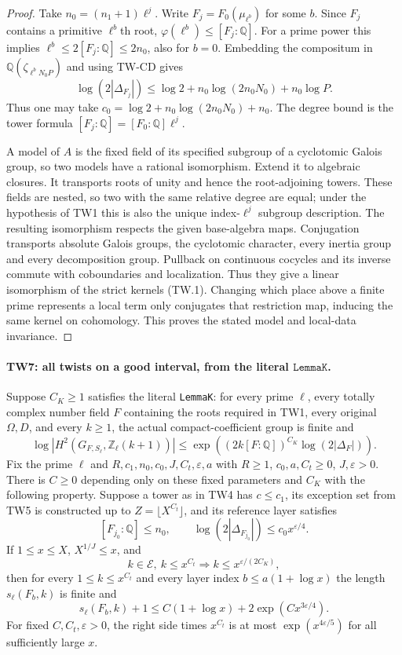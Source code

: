 \begin{proof}
Take $n_0=(n_1+1)\ell^j$.
Write $F_j=F_0(\mu_{\ell^b})$ for some $b$.
Since $F_j$ contains a primitive $\ell^b$th root,
$\varphi(\ell^b)\le[F_j:\mathbb Q]$.
For a prime power this implies
$\ell^b\le2[F_j:\mathbb Q]\le2n_0$, also for $b=0$.
Embedding the compositum in
$\mathbb Q(\zeta_{\ell^bN_0P})$ and using TW-CD gives
\[
 \log(2|\Delta_{F_j}|)
 \le \log2+n_0\log(2n_0N_0)+n_0\log P.
 \tag{TW.27}
\]
Thus one may take
$c_0=\log2+n_0\log(2n_0N_0)+n_0$.
The degree bound is the tower formula
$[F_j:\mathbb Q]=[F_0:\mathbb Q]\ell^j$.

A model of $A$ is the fixed field of its specified subgroup
of a cyclotomic Galois group, so two models have a rational
isomorphism.  Extend it to algebraic closures.  It transports
roots of unity and hence the root-adjoining towers.  These
fields are nested, so two with the same relative degree are
equal; under the hypothesis of TW1 this is also the unique
index-$\ell^j$ subgroup description.
The resulting isomorphism respects the
given base-algebra maps.  Conjugation transports absolute
Galois groups, the cyclotomic character, every inertia group
and every decomposition group.  Pullback on continuous
cocycles and its inverse commute with coboundaries and
localization.  Thus they give a linear isomorphism of the
strict kernels (TW.1).  Changing which place above a finite
prime represents a local term only conjugates that
restriction map, inducing the same kernel on cohomology.
This proves the stated model and local-data invariance.
\end{proof}

\paragraph{TW7: all twists on a good interval, from the literal \(\texttt{LemmaK}\).}
\label{claim:TW7}
Suppose $C_K\ge1$ satisfies the literal \texttt{LemmaK}:
for every prime $\ell$, every totally complex number field $F$
containing the roots required in TW1, every original $\Omega,D$,
and every $k\ge1$, the actual compact-coefficient group is
finite and
\[
 \log\left|H^2(G_{F,S_\ell},\mathbb Z_\ell(k+1))\right|
 \le
 \exp\!\left((2k[F:\mathbb Q])^{C_K}
                         \log(2|\Delta_F|)\right).       \tag{TW.28}
\]
Fix the prime $\ell$ and $R,c_1,n_0,c_0,J,C_t,\varepsilon,a$ with
$R\ge1$, $c_0,a,C_t\ge0$, $J,\varepsilon>0$.
There is $C\ge0$ depending only on these fixed parameters
and $C_K$ with the following property.
Suppose a tower as in TW4 has $c\le c_1$, its exception set
from TW5 is constructed up to $Z=\lfloor X^{C_t}\rfloor$,
and its reference layer satisfies
\[
 [F_{j_0}:\mathbb Q]\le n_0,\qquad
 \log(2|\Delta_{F_{j_0}}|)\le c_0x^{\varepsilon/4}.        \tag{TW.29}
\]
If $1\le x\le X$, $X^{1/J}\le x$, and
\[
 k\in\mathcal E,\ k\le x^{C_t}
              \Longrightarrow k\le x^{\varepsilon/(2C_K)},
 \tag{TW.30}
\]
then for every $1\le k\le x^{C_t}$ and every layer index
$b\le a(1+\log x)$ the length $s_\ell(F_b,k)$ is finite and
\[
 s_\ell(F_b,k)+1\le
       C(1+\log x)+2\exp(Cx^{3\varepsilon/4}).
 \tag{TW.31}
\]
For fixed $C,C_t,\varepsilon>0$, the right side times $x^{C_t}$
is at most $\exp(x^{4\varepsilon/5})$ for all sufficiently
large $x$.

